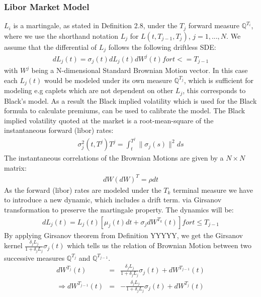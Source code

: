 \documentclass[11pt]{article}
\numberwithin{equation}{subsection}
\begin{document}
\subsubsection{Libor Market Model}
\(L_i\) is a martingale, as stated in Definition 2.8, under the \(T_{j}\) forward measure \(\mathbb{Q}^{T_i}\), where we use the shorthand notation \(L_{j}\) for \(L(t, T_{j-1}, T_{j})\), \(j=1,...,N\). We assume that the differential of \(L_{j}\) follows the following driftless SDE:
\begin{eqnarray*}
	dL_{j}(t) = \sigma_{j}(t) dL_{j}(t)dW^{j}(t) for t <= T_{j-1}
\end{eqnarray*}
with \(W^{j}\) being a N-dimensional Standard Brownian Motion vector. In this case each \(L_{j}(t)\) would be modeled under its own measure \(\mathbb{Q}^{T_j}\), which is sufficient for modeling e.g caplets which are not dependent on other \(L_{j}\), this corresponds to Black's model. As a result the Black implied volatility which is used for the Black formula to calculate premiums, can be used to calibrate the model. The Black implied volatility quoted at the market is a root-mean-square of the instantaneous forward (libor) rates:
\begin{eqnarray*}
	\sigma_{j}^{2}(t, T^j)T^j = \int_{t}^{T^j} \|\sigma_{j}(s)\|^{2} ds
\end{eqnarray*}
The instantaneous correlations of the Brownian Motions are given by a \(N \times N\) matrix:
\begin{eqnarray*}
	dW(dW)^{T} = \rho dt
\end{eqnarray*}
As the forward (libor) rates are modeled under the \(T_{k}\) terminal measure we have to introduce a new dynamic, which includes a drift term. via Girsanov transformation to preserve the martingale property. The dynamics will be:
\begin{eqnarray*}
	dL_{j}(t) = L_{j}(t)[\mu_{j}(t)dt + \sigma_{j} dW^{T_k}(t)] for t \leq T_{j-1}
\end{eqnarray*}
By applying Girsanov theorem from Definition YYYYY, we get the Girsanov kernel \(\frac{\delta_{j}L_{j}}{1+\delta_{j}L_{j}}\sigma_{j}(t)\)  which tells us the relation of Brownian Motion between two successive measures \(\mathbb{Q}^{T_j}\) and \(\mathbb{Q}^{T_{j-1}}\).
\begin{eqnarray*}
	dW^{T_j}(t) &=& \frac{\delta_{j}L_{j}}{1+\delta_{j}L_{j}}\sigma_{j}(t) + dW^{T_{j-1}}(t) \\
	\Rightarrow dW^{T_{j-1}}(t) &=& -\frac{\delta_{j}L_{j}}{1+\delta_{j}L_{j}}\sigma_{j}(t) + dW^{T_{j}}(t)
\end{eqnarray*}
\end{document}
